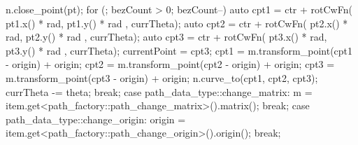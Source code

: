 \begin{codeblock}
{{{{					n.close_point(pt);
				}
				for (; bezCount > 0; bezCount--) {
					auto cpt1 = ctr + rotCwFn({ pt1.x() * rad, pt1.y() * rad }, currTheta);
					auto cpt2 = ctr + rotCwFn({ pt2.x() * rad, pt2.y() * rad }, currTheta);
					auto cpt3 = ctr + rotCwFn({ pt3.x() * rad, pt3.y() * rad }, currTheta);
					currentPoint = cpt3;
					cpt1 = m.transform_point(cpt1 - origin) + origin;
					cpt2 = m.transform_point(cpt2 - origin) + origin;
					cpt3 = m.transform_point(cpt3 - origin) + origin;
					n.curve_to(cpt1, cpt2, cpt3);
					currTheta -= theta;
				}
			} break;
			case path_data_type::change_matrix:
			{
				m = item.get<path_factory::path_change_matrix>().matrix();
			} break;
			case path_data_type::change_origin:
			{
				origin = item.get<path_factory::path_change_origin>().origin();
			} break;
		}
	}
\end{codeblock}

%
%
%
%	
%	
%
%

\addtocounter{SectionDepthBase}{1}
%
%
%


\addtocounter{SectionDepthBase}{1}
%












%
\addtocounter{SectionDepthBase}{-1}
